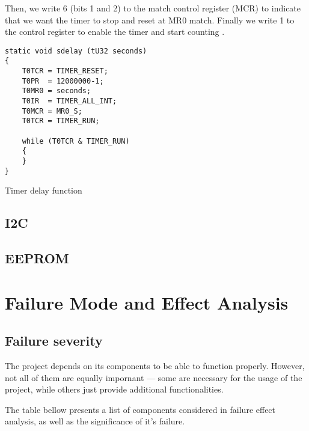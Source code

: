 \documentclass[10pt]{article}
\begin{document}
Then, we write 6 (bits 1 and 2) to the match control register (MCR) to indicate that we want the timer to stop and reset at MR0 match.
Finally we write 1 to the control register to enable the timer and start counting \cite[p.251]{lpc2148-manual}.

\begin{program}[H]
	\begin{lstlisting}
static void sdelay (tU32 seconds)
{
    T0TCR = TIMER_RESET;  
    T0PR  = 12000000-1;             
    T0MR0 = seconds;
    T0IR  = TIMER_ALL_INT;          
    T0MCR = MR0_S;      
    T0TCR = TIMER_RUN;  

    while (T0TCR & TIMER_RUN)
    {
    }
}
	\end{lstlisting}
	\caption{Timer delay function}
\end{program}

\subsection{I2C}

\subsection{EEPROM}

\section{Failure Mode and Effect Analysis}

\subsection{Failure severity}

The project depends on its components to be able to function properly.
However, not all of them are equally impornant --- some are necessary for the usage of the project,
while others just provide additional functionalities.

The table bellow presents a list of components considered in failure effect analysis, as well as the significance of it's failure.
\end{document}
